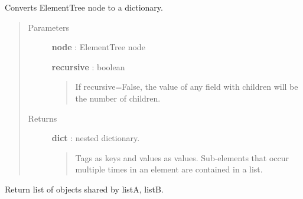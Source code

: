 \documentclass[letterpaper,10pt,english]{sphinxmanual}
\begin{document}
\begin{fulllineitems}
\label{tethne.utilities:tethne.utilities.dict_from_node}
Converts ElementTree node to a dictionary.
\begin{quote}\begin{description}
\item[{Parameters }] \leavevmode
\textbf{node} : ElementTree node

\textbf{recursive} : boolean
\begin{quote}

If recursive=False, the value of any field with children will be the
number of children.
\end{quote}

\item[{Returns }] \leavevmode
\textbf{dict} : nested dictionary.
\begin{quote}

Tags as keys and values as values. Sub-elements that occur multiple
times in an element are contained in a list.
\end{quote}

\end{description}\end{quote}

\end{fulllineitems}


\begin{fulllineitems}
\label{tethne.utilities:tethne.utilities.overlap}
Return list of objects shared by listA, listB.

\end{fulllineitems}

\end{document}
